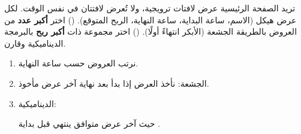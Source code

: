 \begin{statement}
تريد الصفحة الرئيسية عرض لافتات ترويجية، ولا تُعرض لافتتان في نفس الوقت. لكل عرض هيكل  (الاسم، ساعة البداية، ساعة النهاية، الربح المتوقع). () اختر \textbf{أكبر عدد} من العروض بالطريقة الجشعة (الأبكر انتهاءً أولًا). () اختر مجموعة ذات \textbf{أكبر ربح} بالبرمجة الديناميكية وقارن.
\end{statement}
\begin{stepsbox}\begin{enumerate}
\item نرتب العروض حسب ساعة النهاية.
\item الجشعة: نأخذ العرض إذا بدأ بعد نهاية آخر عرض مأخوذ.
\item الديناميكية: \par{\centering\small{}\par} حيث  آخر عرض متوافق ينتهي قبل بداية .
\end{enumerate}\end{stepsbox}
